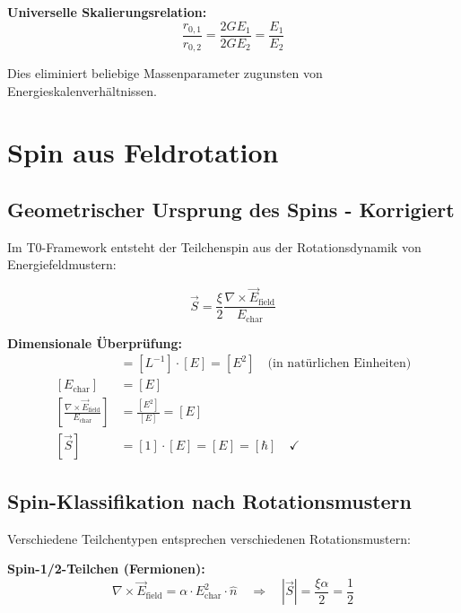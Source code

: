 \documentclass[12pt,a4paper]{report}
\begin{document}
	\textbf{Universelle Skalierungsrelation:}
	\begin{equation}
		\frac{r_{0,1}}{r_{0,2}} = \frac{2GE_1}{2GE_2} = \frac{E_1}{E_2}
	\end{equation}
	
	Dies eliminiert beliebige Massenparameter zugunsten von Energieskalenverhältnissen.
	
	\section{Spin aus Feldrotation}
	\label{sec:spin_from_rotation}
	
	\subsection{Geometrischer Ursprung des Spins - Korrigiert}
	\label{subsec:geometric_spin}
	
	Im T0-Framework entsteht der Teilchenspin aus der Rotationsdynamik von Energiefeldmustern:
	
	\begin{equation}
		\vec{S} = \frac{\xi}{2} \frac{\nabla \times \vec{E}_{\text{field}}}{E_{\text{char}}}
		\label{eq:spin_energy_field_corrected}
	\end{equation}
	
	\textbf{Dimensionale Überprüfung:}
	\begin{align}
		[\nabla \times \vec{E}_{\text{field}}] &= [L^{-1}] \cdot [E] = [E^2] \quad \text{(in natürlichen Einheiten)} \\
		[E_{\text{char}}] &= [E] \\
		\left[\frac{\nabla \times \vec{E}_{\text{field}}}{E_{\text{char}}}\right] &= \frac{[E^2]}{[E]} = [E] \\
		[\vec{S}] &= [1] \cdot [E] = [E] = [\hbar] \quad \checkmark
	\end{align}
	
	\subsection{Spin-Klassifikation nach Rotationsmustern}
	\label{subsec:spin_classification}
	
	Verschiedene Teilchentypen entsprechen verschiedenen Rotationsmustern:
	
	\textbf{Spin-1/2-Teilchen (Fermionen):}
	\begin{equation}
		\nabla \times \vec{E}_{\text{field}} = \alpha \cdot E_{\text{char}}^2 \cdot \hat{n} \quad \Rightarrow \quad |\vec{S}| = \frac{\xi \alpha}{2} = \frac{1}{2}
	\end{equation}
	
\end{document}
